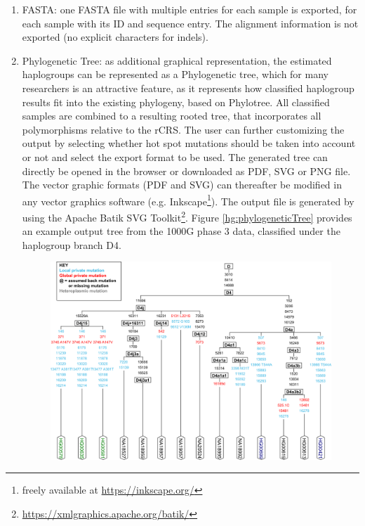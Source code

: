 \begin{enumerate}
\item  FASTA: one FASTA file with multiple entries for each sample is exported, for each sample with its ID and sequence entry. The alignment information is not exported (no explicit characters for indels).
\item Phylogenetic Tree: as additional graphical representation, the estimated haplogroups can be represented as a Phylogenetic tree, which for many researchers is an attractive feature, as it represents how classified haplogroup results fit into the existing phylogeny, based on Phylotree. All classified samples are combined to a resulting rooted tree, that incorporates all polymorphisms relative to the rCRS. The user can further customizing the output by selecting whether hot spot mutations should be taken into account or not and select the export format to be used. The generated tree can directly be opened in the browser or downloaded as PDF, SVG or PNG file. The vector graphic formats (PDF and SVG) can thereafter be modified in any vector graphics software (e.g. Inkscape\footnote{freely available at \url{https://inkscape.org/}}). The output file is generated by using the Apache Batik SVG Toolkit\footnote{\url{https://xmlgraphics.apache.org/batik/}}. Figure \ref{hg:phylogeneticTree} provides an example output tree from the 1000G phase 3 data, classified under the haplogroup branch D4.
\begin{figure}[!ht]
    \centering
    \includegraphics[width=1\textwidth]{images/treeD4.png}

\end{figure}
\end{enumerate}
